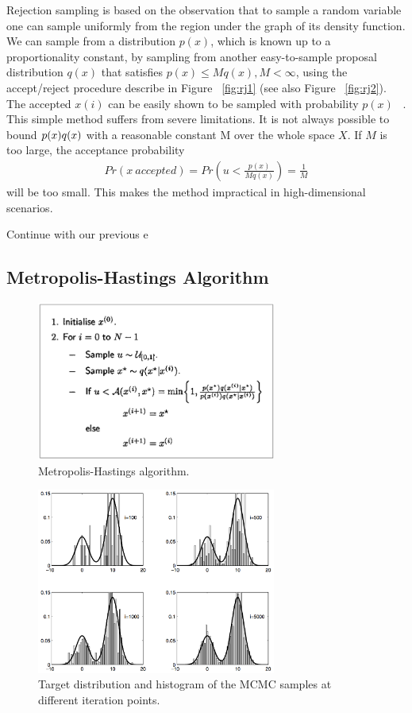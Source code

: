 Rejection sampling is based on the observation that to sample a random variable one can sample uniformly from the region under the graph of its density function. We can sample from a distribution $p(x)$, which is known up to a proportionality constant, by sampling from another easy-to-sample proposal distribution $q(x)$ that satisﬁes $p(x) \leq Mq(x), M < \infty$, using the accept/reject procedure describe in Figure ~\ref{fig:rj1} (see also Figure ~\ref{fig:rj2}). ~\cite{mcmc}
The accepted $x(i)$ can be easily shown to be sampled with probability $p(x)$ ~\cite{robert}. This simple method suffers from severe limitations. It is not always
possible to bound $p(x) \/ q(x)$ with a reasonable constant M over the whole space $X$. If $M$ is too large, the acceptance probability 
\begin{align*}
  Pr(x ~ accepted) = Pr(u < \frac{p(x)}{Mq(x)}) = \frac{1}{M}
\end{align*}
will be too small. This makes the method impractical in high-dimensional scenarios.

Continue with our previous e
\subsection{Metropolis-Hastings Algorithm}

\begin{figure}
    \centering
    \includegraphics[width=0.7\textwidth]{figures/mh.png}
    \caption{Metropolis-Hastings algorithm.}
    \label{fig:mh}
\end{figure}

\begin{figure}
    \centering
    \includegraphics[width=0.7\textwidth]{figures/mh2.png}
    \caption{Target distribution and histogram of the MCMC samples at different iteration points.}
    \label{fig:mh2}
\end{figure}

